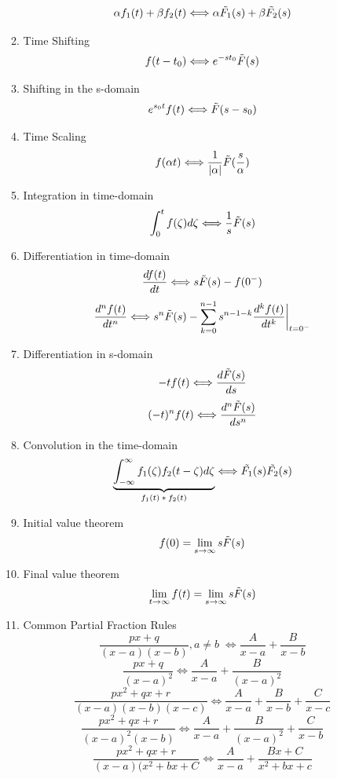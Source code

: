 \documentclass{article}
\begin{document}
\begin{enumerate}
\begin{enumerate}
        \[\alpha f_1(t)+\beta f_2(t) \Longleftrightarrow \alpha \tilde{F_1}(s) + \beta\Tilde{F_2}(s)\]
        \item Time Shifting
        \[f(t-t_0) \Longleftrightarrow e^{-st_0}\Tilde{F}(s)\]
        \item Shifting in the s-domain 
        \[e^{s_0t}f(t) \Longleftrightarrow \Tilde{F}(s-s_0)\]
        \item Time Scaling
        \[f(\alpha t) \Longleftrightarrow \frac{1}{|\alpha|}\Tilde{F}(\frac{s}{\alpha})\]
        \item Integration in time-domain
        \[\int^t_0f(\zeta)d\zeta \Longleftrightarrow \frac{1}{s}\Tilde{F}(s)\]
        \item Differentiation in time-domain
        \[\frac{df(t)}{dt} \Longleftrightarrow s\Tilde{F}(s)-f(0^-)\]
        \[\frac{d^nf(t)}{dt^n} \Longleftrightarrow s^n\Tilde{F}(s)-\sum^{n-1}_{k=0}s^{n-1-k}\frac{d^kf(t)}{dt^k}\bigg|_{t=0^-}\]
        \item Differentiation in s-domain
        \[-tf(t) \Longleftrightarrow \frac{d\Tilde{F}(s)}{ds}\]
        \[(-t)^nf(t) \Longleftrightarrow \frac{d^n\Tilde{F}(s)}{ds^n}\]
        \item Convolution in the time-domain
        \[\underbrace{\int^{\infty}_{-\infty}f_1(\zeta)f_2(t-\zeta)d\zeta}_\text{$f_1(t)*f_2(t)$} \Longleftrightarrow \Tilde{F_1}(s)\Tilde{F_2}(s)\]
        \item Initial value theorem
        \[f(0) = \lim_{s\rightarrow \infty}s\Tilde{F}(s)\]
        \item Final value theorem
        \[\lim_{t\rightarrow\infty}f(t) = \lim_{s\rightarrow\infty}s\Tilde{F}(s)\]
        \item Common Partial Fraction Rules
        \[\frac{px+q}{(x-a)(x-b)}, a\neq b \; \Longleftrightarrow \frac{A}{x-a}+\frac{B}{x-b}\]
        \[\frac{px+q}{(x-a)^2} \Longleftrightarrow \frac{A}{x-a}+\frac{B}{(x-a)^2}\]
        \[\frac{px^2+qx+r}{(x-a)(x-b)(x-c)} \Longleftrightarrow \frac{A}{x-a}+\frac{B}{x-b}+\frac{C}{x-c}\]
        \[\frac{px^2+qx+r}{(x-a)^2(x-b)} \Longleftrightarrow \frac{A}{x-a}+\frac{B}{(x-a)^2}+\frac{C}{x-b}\]
        \[\frac{px^2+qx+r}{(x-a)(x^2+bx+C} \Longleftrightarrow \frac{A}{x-a}+\frac{Bx+C}{x^2+bx+c}\]
    \end{enumerate}
\end{enumerate}
\end{document}
